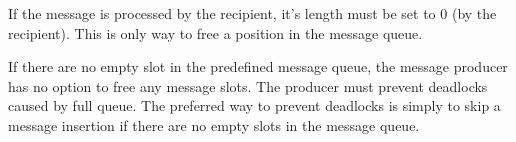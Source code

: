 If the message is processed by the recipient, it's length must be set to 0 (by the recipient). This is only way to free a position in the message queue.

If there are no empty slot in the predefined message queue, the message producer has no option to free any message slots. The producer must prevent deadlocks caused by full queue. The preferred way to prevent deadlocks is simply to skip a message insertion if there are no empty slots in the message queue.


  




  




